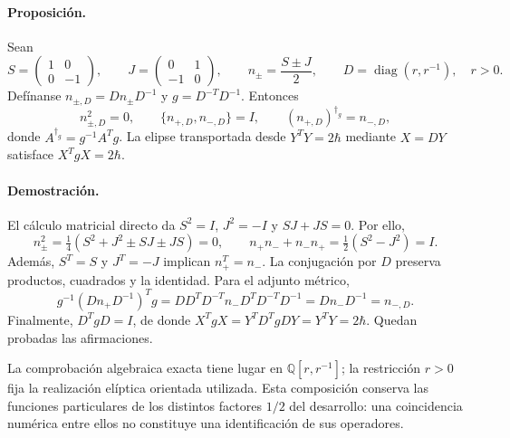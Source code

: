 \paragraph{Proposición.}
Sean
\begin{equation}
 S=\begin{pmatrix}1&0\\0&-1\end{pmatrix},\qquad
 J=\begin{pmatrix}0&1\\-1&0\end{pmatrix},\qquad
 n_\pm=\frac{S\pm J}{2},\qquad
 D=\operatorname{diag}(r,r^{-1}),\quad r>0.
 \label{md:compos:bloque-nilpotente}
\end{equation}
Defínanse $n_{\pm,D}=Dn_\pm D^{-1}$ y $g=D^{-T}D^{-1}$. Entonces
\begin{equation}
 n_{\pm,D}^2=0,\qquad
 \{n_{+,D},n_{-,D}\}=I,\qquad
 (n_{+,D})^{\dagger_g}=n_{-,D},
 \label{md:compos:identidades-nilpotentes}
\end{equation}
donde $A^{\dagger_g}=g^{-1}A^Tg$. La elipse transportada desde
$Y^TY=2\hbar$ mediante $X=DY$ satisface $X^TgX=2\hbar$.

\paragraph{Demostración.}
El cálculo matricial directo da
$S^2=I$, $J^2=-I$ y $SJ+JS=0$. Por ello,
\[
 n_\pm^2=\tfrac14(S^2+J^2\pm SJ\pm JS)=0,
 \qquad
 n_+n_-+n_-n_+=\tfrac12(S^2-J^2)=I.
\]
Además, $S^T=S$ y $J^T=-J$ implican $n_+^T=n_-$. La conjugación por $D$
preserva productos, cuadrados y la identidad. Para el adjunto métrico,
\[
 g^{-1}(Dn_+D^{-1})^Tg
 =DD^T D^{-T}n_-D^T D^{-T}D^{-1}
 =Dn_-D^{-1}=n_{-,D}.
\]
Finalmente, $D^TgD=I$, de donde
$X^TgX=Y^TD^TgDY=Y^TY=2\hbar$. Quedan probadas las afirmaciones.

La comprobación algebraica exacta tiene lugar en
$\mathbb Q[r,r^{-1}]$; la restricción $r>0$ fija la realización elíptica
orientada utilizada. Esta composición conserva las funciones particulares
de los distintos factores $1/2$ del desarrollo: una coincidencia numérica
entre ellos no constituye una identificación de sus operadores.
